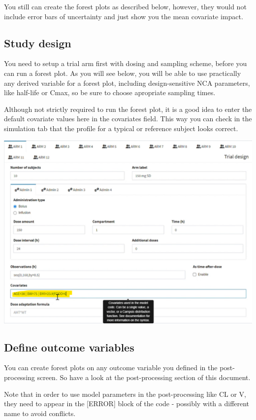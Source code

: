 \documentclass[
]{book}
\begin{document}
You still can create the forest plots as described below, however, they would not include error bars of uncertainty and just show you the mean covariate impact.

\subsection{Study design}\label{study-design}

You need to setup a trial arm first with dosing and sampling scheme, before you can run a forest plot. As you will see below, you will be able to use practically any derived variable for a forest plot, including design-sensitive NCA parameters, like half-life or Cmax, so be sure to choose apropriate sampling times.

Although not strictly required to run the forest plot, it is a good idea to enter the default covariate values here in the covariates field. This way you can check in the simulation tab that the profile for a typical or reference subject looks correct.

\includegraphics{pictures/design_forest_plot.png}

\subsection{Define outcome variables}\label{define-outcome-variables}

You can create forest plots on any outcome variable you defined in the post-processing screen. So have a look at the post-processing section of this document.

Note that in order to use model parameters in the post-processing like CL or V, they need to appear in the {[}ERROR{]} block of the code - possibly with a different name to avoid conflicts.
\end{document}
